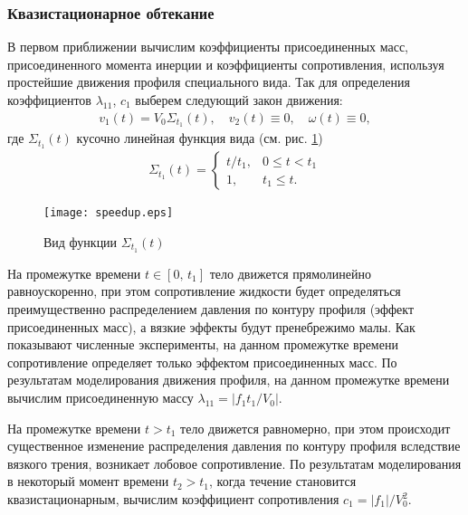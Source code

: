 \subsubsection*{Квазистационарное обтекание}

В первом приближении вычислим коэффициенты присоединенных масс, присоединенного момента инерции и коэффициенты сопротивления, используя простейшие движения профиля специального вида. Так для определения коэффициентов $\lambda_{11}$, $c_1$ выберем следующий закон движения:
\begin{gather}
	v_1(t) = V_0 \Sigma_{t_1}(t),\quad v_2(t) \equiv 0,\quad \omega(t) \equiv 0,
\end{gather}
где $\Sigma_{t_1}(t)$ кусочно линейная функция вида (см. рис. \ref{fig.sigma})
\begin{gather}
	\Sigma_{t_1}(t) = \begin{cases}
		t / t_1, & 0 \leqslant t < t_1\\
		1, & t_1 \leqslant t.
	\end{cases}
\end{gather}

\begin{figure}[ht!]
	\centering
	\texttt{[image: speedup.eps]}
	\caption{Вид функции $\Sigma_{t_1}(t)$}\label{fig.sigma}
\end{figure}

На промежутке времени $t \in [0,\, t_1]$ тело движется прямолинейно равноускоренно, при этом сопротивление жидкости будет определяться преимущественно распределением давления по контуру профиля (эффект присоединенных масс), а вязкие эффекты будут пренебрежимо малы. Как показывают численные эксперименты, на данном промежутке времени сопротивление определяет только эффектом присоединенных масс. По результатам моделирования движения профиля, на данном промежутке времени вычислим присоединенную массу $\lambda_{11} = |f_1 t_1 / V_0|$.

На промежутке времени $t > t_1$ тело движется равномерно, при этом происходит существенное изменение распределения давления по контуру профиля вследствие вязкого трения, возникает лобовое сопротивление. По результатам моделирования в некоторый момент времени $t_2 > t_1$, когда течение становится квазистационарным, вычислим коэффициент сопротивления $c_1 = |f_1| / V_0^2$.

